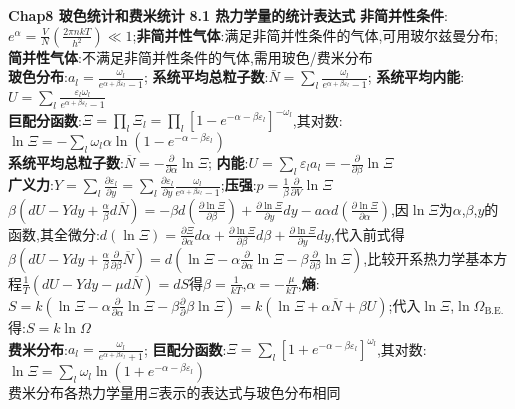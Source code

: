 \documentclass[10pt,a4paper]{article}
\begin{document}
\begin{multicols}{2}
\noindent\textbf{Chap8 玻色统计和费米统计}
\textbf{8.1 热力学量的统计表达式}
\textbf{非简并性条件}:$e^{\alpha}=\frac{V}{N}\left(\frac{2\pi nkT}{h^2}\right)\ll1$;\textbf{非简并性气体}:满足非简并性条件的气体,可用玻尔兹曼分布;\textbf{简并性气体}:不满足非简并性条件的气体,需用玻色/费米分布\\
\textbf{玻色分布}:$a_l=\frac{\omega_l}{e^{\alpha+\beta\varepsilon_l}-1}$;
\textbf{系统平均总粒子数}:$\bar{N}=\sum_l\frac{\omega_l}{e^{\alpha+\beta\varepsilon_l}-1}$;
\textbf{系统平均内能}:$U=\sum_l\frac{\varepsilon_l\omega_l}{e^{\alpha+\beta\varepsilon_l}-1}$\\
\textbf{巨配分函数}:$\Xi=\prod_l\Xi_l=\prod_l[1-e^{-\alpha-\beta\varepsilon_l}]^{-\omega_l}$,其对数:$\ln\Xi=-\sum_l\omega_l\alpha\ln(1-e^{-\alpha-\beta\varepsilon_l})$\\
\textbf{系统平均总粒子数}:$\overline{N}=-\frac{\partial}{\partial\alpha}\ln\Xi$;
\textbf{内能}:$U=\sum_l\varepsilon_la_l=-\frac{\partial}{\partial\beta}\ln\Xi$\\
\textbf{广义力}:$Y=\sum_l\frac{\partial\varepsilon_l}{\partial y}=\sum_l\frac{\partial\varepsilon_l}{\partial y}\frac{\omega_l}{e^{\alpha+\beta\varepsilon_l}-1}$;\textbf{压强}:$p=\frac{1}{\beta}\frac{\partial}{\partial V}\ln\Xi$\\
$\beta\left(dU-Ydy+\frac{\alpha}{\beta}d\overline{N}\right)=-\beta d\left(\frac{\partial\ln\Xi}{\partial\beta}\right)+\frac{\partial\ln\Xi}{\partial y}dy-a\alpha d\left(\frac{\partial\ln\Xi}{\partial\alpha}\right)$,因$\ln\Xi$为$\alpha$,$\beta$,$y$的函数,其全微分:$d(\ln\Xi)=\frac{\partial\Xi}{\partial\alpha}d\alpha+\frac{\partial\ln\Xi}{\partial\beta}d\beta+\frac{\partial\ln\Xi}{\partial y}dy$,代入前式得$\beta\left(dU-Ydy+\frac{\alpha}{\beta}\frac{\partial}{\partial\beta}\overline{N}\right)=d\left(\ln\Xi-\alpha\frac{\partial}{\partial\alpha}\ln\Xi-\beta\frac{\partial}{\partial\beta}\ln\Xi\right)$,比较开系热力学基本方程$\frac{1}{T}(dU-Ydy-\mu d\overline{N})=dS$得$\beta=\frac{1}{kT}$,$\alpha=-\frac{\mu}{kT}$,\textbf{熵}:$S=k(\ln\Xi-\alpha\frac{\partial}{\partial\alpha}\ln\Xi-\beta\frac{\partial}{\partial}\beta\ln\Xi)=k(\ln\Xi+\alpha\overline{N}+\beta U)$;代入$\ln\Xi$,$\ln\Omega_{\text{B.E.}}$得:$S=k\ln\Omega$\\
\textbf{费米分布}:$a_l=\frac{\omega_l}{e^{\alpha+\beta\varepsilon_l}+1}$;
\textbf{巨配分函数}:$\Xi=\sum_l[1+e^{-\alpha-\beta\varepsilon_l}]^{\omega_l}$,其对数:$\ln\Xi=\sum_l\omega_l\ln(1+e^{-\alpha-\beta\varepsilon_l})$\\
费米分布各热力学量用$\Xi$表示的表达式与玻色分布相同\\

\end{multicols}
\end{document}
